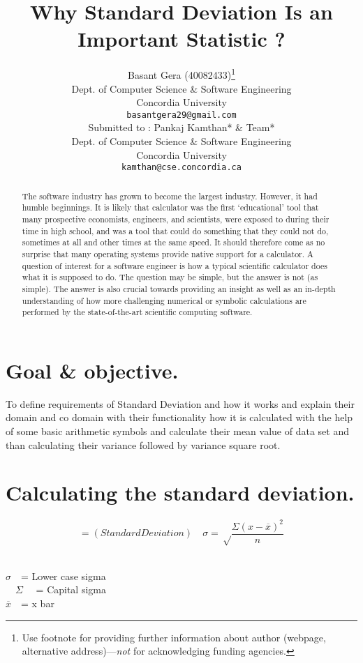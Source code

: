\documentclass{article}
\title{Why Standard Deviation Is an Important Statistic ?}
\author{
  Basant Gera (40082433)\thanks{Use footnote for providing further
    information about author (webpage, alternative
    address)---\emph{not} for acknowledging funding agencies.} \\
  Dept. of Computer Science \& Software Engineering\\
  Concordia University\\
  \texttt{basantgera29@gmail.com} \\
   \And
Submitted to : Pankaj Kamthan* \& Team*\\
   Dept. of Computer Science \& Software Engineering\\
  Concordia University\\
  \texttt{kamthan@cse.concordia.ca} \\
}
\begin{document}
\maketitle

\begin{abstract}
The software industry has grown to become the largest industry. However, it had humble
beginnings.
It is likely that calculator was the first ‘educational’ tool that many prospective
economists, engineers, and scientists, were exposed to during their time in high school,
and was a tool that could do something that they could not do, sometimes at all and other
times at the same speed. It should therefore come as no surprise that many operating
systems provide native support for a calculator.
A question of interest for a software engineer is how a typical scientific calculator does
what it is supposed to do. The question may be simple, but the answer is not (as
simple). The answer is also crucial towards providing an insight as well as an in-depth
understanding of how more challenging numerical or symbolic calculations are
performed by the state-of-the-art scientific computing software. 
\end{abstract}

\section{Goal \& objective.}
To define requirements of Standard Deviation and how it works and explain their domain and co domain with their functionality how it is calculated with the help of some basic arithmetic symbols and calculate their mean value of data set and than calculating their variance followed by variance square root. 

\section{Calculating the standard deviation.}

\begin{equation*}=
   (Standard Deviation) \quad \sigma = \sqrt\frac{{\Sigma (x- \overline{x})^2}}{n}
  \end{equation*}
  \\
\begin{center}
     $\sigma \quad$= Lower case sigma\\
  $\quad\Sigma \quad$ = Capital sigma\\
  \quad$\overline{x}\quad $= x bar
\end{center} 
  
\end{document}
